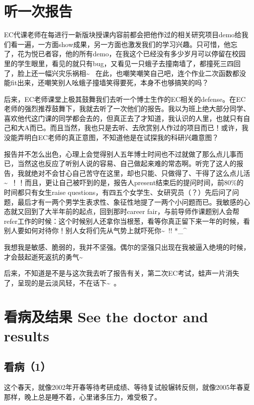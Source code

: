 \documentclass[12pt]{book}
\begin{document}
\chapter{听一次报告}
\label{sec-29}

EC代课老师在每进行一新版块授课内容前都会把他作过的相关研究项目demo给我们看一遍，一方面show成果，另一方面也激发我们的学习兴趣。只可惜，他忘了，花为悦已者容，他的所有demo，在我这个已经没有多少岁月可以停留在校园里的学生眼里，看见的就只有bug，又看见一只蛾子去撞南墙了，都撞死三四回了，脸上还一幅兴灾乐祸相\textasciitilde{}~ 在此，也嘲笑嘲笑自己吧，连个作业二次函数都没能fit出来，还嘲笑别人吆蛾子撞墙笑得要死，本身不也够搞笑的吗？

后来，EC老师课堂上极其鼓舞我们去听一个博士生作的EC相关的defense。在EC老师的强烈推荐鼓舞下，我就去听了一次他们的报告。我以为班上绝大部分同学、喜欢他代这门课的同学都会去的，但真正去了才知道，我认识的人里，也就只有自己和大A而已。而且当然，我也只是去听、去欣赏别人作过的项目而已！或许，我没能弄明白EC老师的真正意图，不知道他是在试探我的科研兴趣意图？

报告并不怎么出色，心理上会觉得别人五年博士时间也不过就做了那么点儿事而已，当然这也反应了听别人说的容易、自己做起来难的常态啊。听完了这人的报告，我就绝对不会甘心自己苦守在这里，却也只能、只做得了、干得了这么点儿活\textasciitilde{}~！！而且，更让自己被吓到的是，报告人present结束后的提问时间，前80\%的时间都只有女生raise questions，有四五个女学生、女研究员（？）先后问了问题，最后才有一两个男学生表求性、象征性地提了一两个小问题而已。我敏感的心态就又回到了大半年前的起点，回到那时career fair，与前导师作课题别人会帮refer工作的时候：这个时候别人还拿你当根葱，看等你真正留下来一年的时候，看别人要如何对待你！别人女将们先从气势上就吓死你\textasciitilde{}~!! *\_\^{}

我想我是敏感、脆弱的，我并不坚强。偶尔的坚强只出现在我被逼入绝境的时候，才会鼓起逝死返抗的勇气\textasciitilde{}~

后来，不知道是不是与这次我去听了报告有关，第二次EC考试，蛙声一片消失了，呈现的是云淡风轻，不在话下\textasciitilde{}~。

\chapter{看病及结果 See the doctor and results}
\label{sec-30}
\section{看病（1）}
\label{sec-30-1}

这个春天，就像2002年开春等待考研成绩、等待复试般辗转反侧，就像2005年春夏那样，晚上总是睡不着，心里诸多压力，难受极了。
\end{document}
